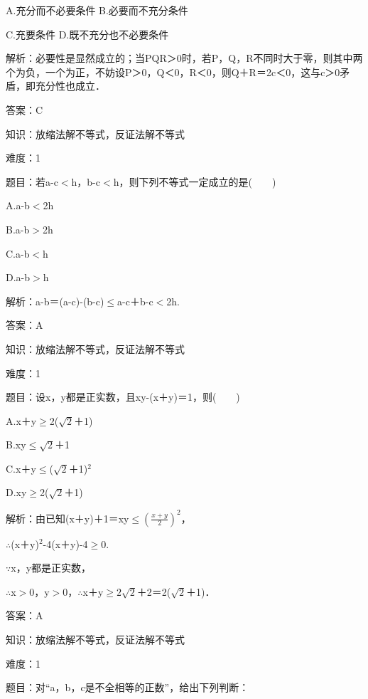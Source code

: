 \documentclass{article} %
\begin{document}
A.充分而不必要条件  B.必要而不充分条件

C.充要条件  D.既不充分也不必要条件

 解析：必要性是显然成立的；当PQR＞0时，若P，Q，R不同时大于零，则其中两个为负，一个为正，不妨设P＞0，Q＜0，R＜0，则Q＋R＝2c＜0，这与c＞0矛盾，即充分性也成立．

 答案：C





 知识：放缩法解不等式，反证法解不等式

 难度：1

 题目：若{\textbar}a-c{\textbar}$\mathrm{<}$h，{\textbar}b-c{\textbar}$\mathrm{<}$h，则下列不等式一定成立的是(　　)

A.{\textbar}a-b{\textbar}$\mathrm{<}$2h　　

B.{\textbar}a-b{\textbar}$\mathrm{>}$2h

C.{\textbar}a-b{\textbar}$\mathrm{<}$h  

D.{\textbar}a-b{\textbar}$\mathrm{>}$h

 解析：{\textbar}a-b{\textbar}＝{\textbar}(a-c)-(b-c){\textbar}$\mathrm{\le}${\textbar}a-c{\textbar}＋{\textbar}b-c{\textbar}$\mathrm{<}$2h.

 答案：A



 知识：放缩法解不等式，反证法解不等式

 难度：1

 题目：设x，y都是正实数，且xy-(x＋y)＝1，则(　　)

A.x＋y$\mathrm{\ge}$2($\sqrt{2}$＋1)  

B.xy$\mathrm{\le}$$\sqrt{2}$＋1

C.x＋y$\mathrm{\le}$($\sqrt{2}$＋1)${}^{2}$ 

D.xy$\mathrm{\ge}$2($\sqrt{2}$＋1)

 解析：由已知(x＋y)＋1＝xy$\mathrm{\le}$$(\frac{x+y}{2})^2$，

$\mathrm{\therefore}$(x＋y)${}^{2}$-4(x＋y)-4$\mathrm{\ge}$0.

$\mathrm{\because}$x，y都是正实数，

$\mathrm{\therefore}$x$\mathrm{>}$0，y$\mathrm{>}$0，$\mathrm{\therefore}$x＋y$\mathrm{\ge}$$2\sqrt{2}$＋2＝2($\sqrt{2}$＋1)．

 答案：A

 

 知识：放缩法解不等式，反证法解不等式

 难度：1

 题目：对``a，b，c是不全相等的正数''，给出下列判断：
\end{document}
